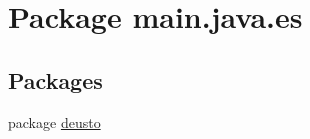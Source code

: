 \hypertarget{namespacemain_1_1java_1_1es}{}\section{Package main.\+java.\+es}
\label{namespacemain_1_1java_1_1es}
\subsection*{Packages}
\begin{DoxyCompactItemize}
\item 
package \hyperlink{namespacemain_1_1java_1_1es_1_1deusto}{deusto}
\end{DoxyCompactItemize}
